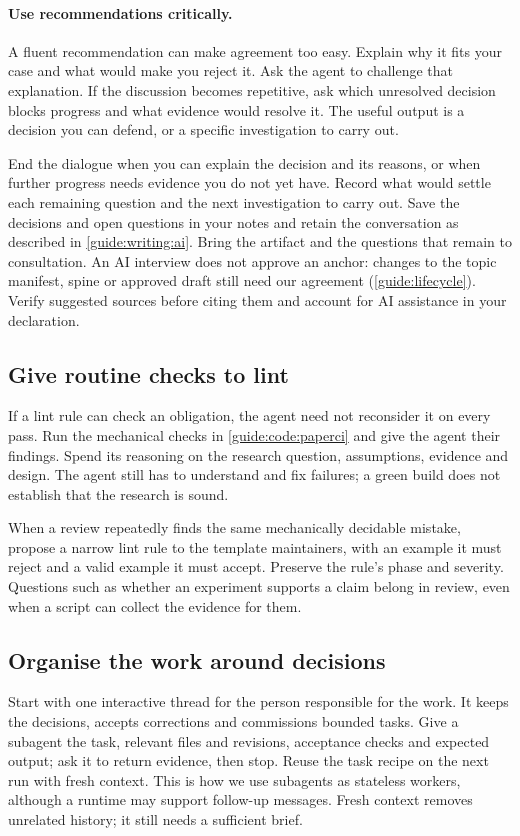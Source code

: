 \paragraph{Use recommendations critically.} A fluent recommendation can make agreement too easy. Explain why it fits your case and what would make you reject it. Ask the agent to challenge that explanation. If the discussion becomes repetitive, ask which unresolved decision blocks progress and what evidence would resolve it. The useful output is a decision you can defend, or a specific investigation to carry out.

End the dialogue when you can explain the decision and its reasons, or when further progress needs evidence you do not yet have. Record what would settle each remaining question and the next investigation to carry out. Save the decisions and open questions in your notes and retain the conversation as described in \cref{guide:writing:ai}. Bring the artifact and the questions that remain to consultation. An AI interview does not approve an anchor: changes to the topic manifest, spine or approved draft still need our agreement (\cref{guide:lifecycle}). Verify suggested sources before citing them and account for AI assistance in your declaration.

\subsection{Give routine checks to lint}\label{guide:code:agents}
If a lint rule can check an obligation, the agent need not reconsider it on every pass. Run the mechanical checks in \cref{guide:code:paperci} and give the agent their findings. Spend its reasoning on the research question, assumptions, evidence and design. The agent still has to understand and fix failures; a green build does not establish that the research is sound.

When a review repeatedly finds the same mechanically decidable mistake, propose a narrow lint rule to the template maintainers, with an example it must reject and a valid example it must accept. Preserve the rule's phase and severity. Questions such as whether an experiment supports a claim belong in review, even when a script can collect the evidence for them.

\subsection{Organise the work around decisions}\label{guide:code:orchestration}
Start with one interactive thread for the person responsible for the work. It keeps the decisions, accepts corrections and commissions bounded tasks. Give a subagent the task, relevant files and revisions, acceptance checks and expected output; ask it to return evidence, then stop. Reuse the task recipe on the next run with fresh context. This is how we use subagents as stateless workers, although a runtime may support follow-up messages. Fresh context removes unrelated history; it still needs a sufficient brief.

